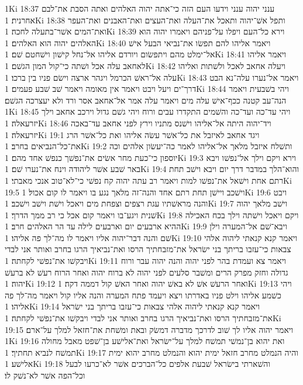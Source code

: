 1Ki 18:37  ענני יהוה ענני וידעו העם הזה כי־אתה יהוה האלהים ואתה הסבת את־לבם אחרנית׃
1Ki 18:38  ותפל אשׁ־יהוה ותאכל את־העלה ואת־העצים ואת־האבנים ואת־העפר ואת־המים אשׁר־בתעלה לחכה׃
1Ki 18:39  וירא כל־העם ויפלו על־פניהם ויאמרו יהוה הוא האלהים יהוה הוא האלהים׃
1Ki 18:40  ויאמר אליהו להם תפשׂו את־נביאי הבעל אישׁ אל־ימלט מהם ויתפשׂום ויורדם אליהו אל־נחל קישׁון וישׁחטם שׁם׃
1Ki 18:41  ויאמר אליהו לאחאב עלה אכל ושׁתה כי־קול המון הגשׁם׃
1Ki 18:42  ויעלה אחאב לאכל ולשׁתות ואליהו עלה אל־ראשׁ הכרמל ויגהר ארצה וישׂם פניו בין ברכו׃
1Ki 18:43  ויאמר אל־נערו עלה־נא הבט דרך־ים ויעל ויבט ויאמר אין מאומה ויאמר שׁב שׁבע פעמים׃
1Ki 18:44  ויהי בשׁבעית ויאמר הנה־עב קטנה ככף־אישׁ עלה מים ויאמר עלה אמר אל־אחאב אסר ורד ולא יעצרכה הגשׁם׃
1Ki 18:45  ויהי עד־כה ועד־כה והשׁמים התקדרו עבים ורוח ויהי גשׁם גדול וירכב אחאב וילך יזרעאלה׃
1Ki 18:46  ויד־יהוה היתה אל־אליהו וישׁנס מתניו וירץ לפני אחאב עד־באכה יזרעאלה׃
1Ki 19:1  ויגד אחאב לאיזבל את כל־אשׁר עשׂה אליהו ואת כל־אשׁר הרג את־כל־הנביאים בחרב׃
1Ki 19:2  ותשׁלח איזבל מלאך אל־אליהו לאמר כה־יעשׂון אלהים וכה יוספון כי־כעת מחר אשׂים את־נפשׁך כנפשׁ אחד מהם׃
1Ki 19:3  וירא ויקם וילך אל־נפשׁו ויבא באר שׁבע אשׁר ליהודה וינח את־נערו שׁם׃
1Ki 19:4  והוא־הלך במדבר דרך יום ויבא וישׁב תחת רתם אחת וישׁאל את־נפשׁו למות ויאמר רב עתה יהוה קח נפשׁי כי־לא־טוב אנכי מאבתי׃
1Ki 19:5  וישׁכב ויישׁן תחת רתם אחד והנה־זה מלאך נגע בו ויאמר לו קום אכול׃
1Ki 19:6  ויבט והנה מראשׁתיו עגת רצפים וצפחת מים ויאכל וישׁת וישׁב וישׁכב׃
1Ki 19:7  וישׁב מלאך יהוה שׁנית ויגע־בו ויאמר קום אכל כי רב ממך הדרך׃
1Ki 19:8  ויקם ויאכל וישׁתה וילך בכח האכילה ההיא ארבעים יום וארבעים לילה עד הר האלהים חרב׃
1Ki 19:9  ויבא־שׁם אל־המערה וילן שׁם והנה דבר־יהוה אליו ויאמר לו מה־לך פה אליהו׃
1Ki 19:10  ויאמר קנא קנאתי ליהוה אלהי צבאות כי־עזבו בריתך בני ישׂראל את־מזבחתיך הרסו ואת־נביאיך הרגו בחרב ואותר אני לבדי ויבקשׁו את־נפשׁי לקחתה׃
1Ki 19:11  ויאמר צא ועמדת בהר לפני יהוה והנה יהוה עבר ורוח גדולה וחזק מפרק הרים ומשׁבר סלעים לפני יהוה לא ברוח יהוה ואחר הרוח רעשׁ לא ברעשׁ יהוה׃
1Ki 19:12  ואחר הרעשׁ אשׁ לא באשׁ יהוה ואחר האשׁ קול דממה דקה׃
1Ki 19:13  ויהי כשׁמע אליהו וילט פניו באדרתו ויצא ויעמד פתח המערה והנה אליו קול ויאמר מה־לך פה אליהו׃
1Ki 19:14  ויאמר קנא קנאתי ליהוה אלהי צבאות כי־עזבו בריתך בני ישׂראל את־מזבחתיך הרסו ואת־נביאיך הרגו בחרב ואותר אני לבדי ויבקשׁו את־נפשׁי לקחתה׃
1Ki 19:15  ויאמר יהוה אליו לך שׁוב לדרכך מדברה דמשׂק ובאת ומשׁחת את־חזאל למלך על־ארם׃
1Ki 19:16  ואת יהוא בן־נמשׁי תמשׁח למלך על־ישׂראל ואת־אלישׁע בן־שׁפט מאבל מחולה תמשׁח לנביא תחתיך׃
1Ki 19:17  והיה הנמלט מחרב חזאל ימית יהוא והנמלט מחרב יהוא ימית אלישׁע׃
1Ki 19:18  והשׁארתי בישׂראל שׁבעת אלפים כל־הברכים אשׁר לא־כרעו לבעל וכל־הפה אשׁר לא־נשׁק לו׃
